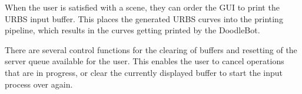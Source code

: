 When the user is satisfied with a scene, they can order the GUI to print the URBS input buffer. This places the generated URBS curves into the printing pipeline, which results in the curves getting printed by the DoodleBot.

There are several control functions for the clearing of buffers and resetting of the server queue available for the user. This enables the user to cancel operations that are in progress, or clear the currently displayed buffer to start the input process over again.
